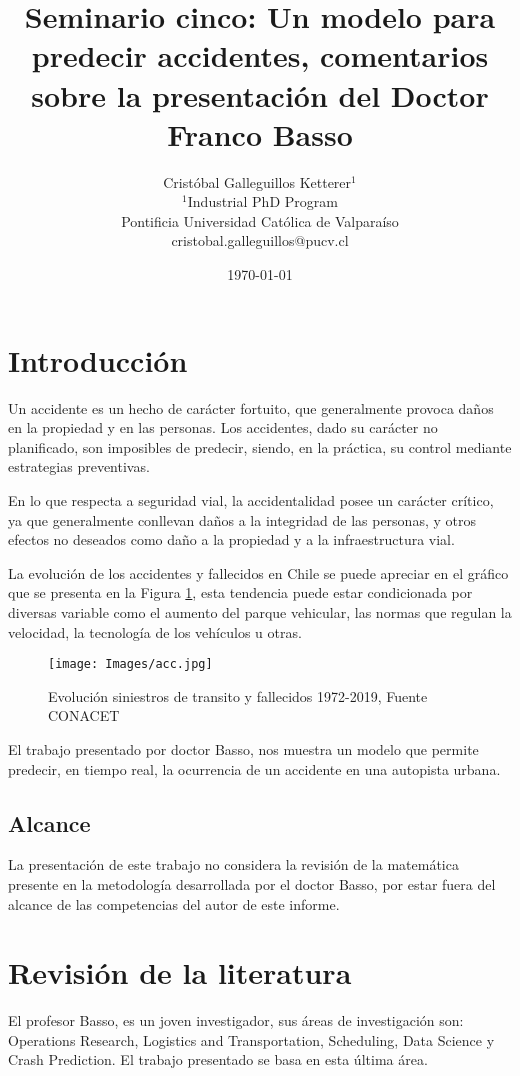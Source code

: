 \documentclass{article}
\title{Seminario cinco: Un modelo para predecir accidentes, comentarios sobre la presentación del Doctor Franco Basso}
\author{Cristóbal Galleguillos Ketterer$^{1}$\\
\small{$^{1}$Industrial PhD Program}\\
\small{Pontificia Universidad Católica de Valparaíso}\\
\small{cristobal.galleguillos@pucv.cl}
}
\date{\small{\today}}
\begin{document}
\maketitle

\section{Introducción}

Un accidente es un hecho de carácter fortuito, que generalmente provoca daños en la propiedad y en las personas. Los accidentes, dado su carácter no planificado, son imposibles de predecir, siendo, en la práctica, su control mediante estrategias preventivas.

En lo que respecta a seguridad vial, la accidentalidad posee un carácter crítico, ya que generalmente conllevan daños a la integridad de las personas, y otros efectos no deseados como daño a la propiedad y a la infraestructura vial.

La evolución de los accidentes y fallecidos en Chile se puede apreciar en el gráfico que se presenta en la Figura \ref{scc}, esta tendencia puede estar condicionada por diversas variable como el aumento del parque vehicular, las normas que regulan la velocidad, la tecnología de los vehículos u otras.

\begin{figure}[H]
\texttt{[image: Images/acc.jpg]}
\centering
\caption{Evolución siniestros de transito y fallecidos 1972-2019, Fuente CONACET}
\label{scc}
\end{figure}

El trabajo presentado por doctor Basso, nos muestra un modelo que permite predecir, en tiempo real, la ocurrencia de un accidente en una autopista urbana.

\subsection{Alcance}

La presentación de este trabajo no considera la revisión de la matemática presente en la metodología desarrollada por el doctor Basso, por estar fuera del alcance de las competencias del autor de este informe.

\section{Revisión de la literatura}

El profesor Basso, es un joven investigador, sus áreas de investigación son: Operations Research, Logistics and Transportation, Scheduling, Data Science y Crash Prediction. El trabajo presentado se basa en esta última área.
\end{document}
